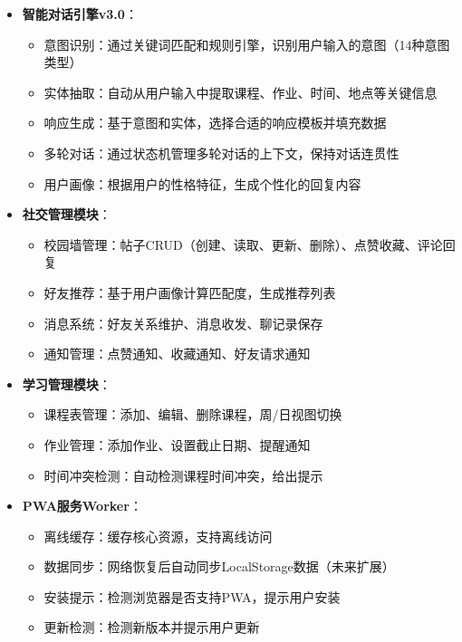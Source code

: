 \documentclass[12pt,a4paper]{article}
\begin{document}
\begin{itemize}
    \item \textbf{智能对话引擎v3.0}：
        \begin{itemize}
            \item 意图识别：通过关键词匹配和规则引擎，识别用户输入的意图（14种意图类型）
            \item 实体抽取：自动从用户输入中提取课程、作业、时间、地点等关键信息
            \item 响应生成：基于意图和实体，选择合适的响应模板并填充数据
            \item 多轮对话：通过状态机管理多轮对话的上下文，保持对话连贯性
            \item 用户画像：根据用户的性格特征，生成个性化的回复内容
        \end{itemize}
    
    \item \textbf{社交管理模块}：
        \begin{itemize}
            \item 校园墙管理：帖子CRUD（创建、读取、更新、删除）、点赞收藏、评论回复
            \item 好友推荐：基于用户画像计算匹配度，生成推荐列表
            \item 消息系统：好友关系维护、消息收发、聊记录保存
            \item 通知管理：点赞通知、收藏通知、好友请求通知
        \end{itemize}
    
    \item \textbf{学习管理模块}：
        \begin{itemize}
            \item 课程表管理：添加、编辑、删除课程，周/日视图切换
            \item 作业管理：添加作业、设置截止日期、提醒通知
            \item 时间冲突检测：自动检测课程时间冲突，给出提示
        \end{itemize}
    
    \item \textbf{PWA服务Worker}：
        \begin{itemize}
            \item 离线缓存：缓存核心资源，支持离线访问
            \item 数据同步：网络恢复后自动同步LocalStorage数据（未来扩展）
            \item 安装提示：检测浏览器是否支持PWA，提示用户安装
            \item 更新检测：检测新版本并提示用户更新
        \end{itemize}
    

\end{itemize}
\end{document}
